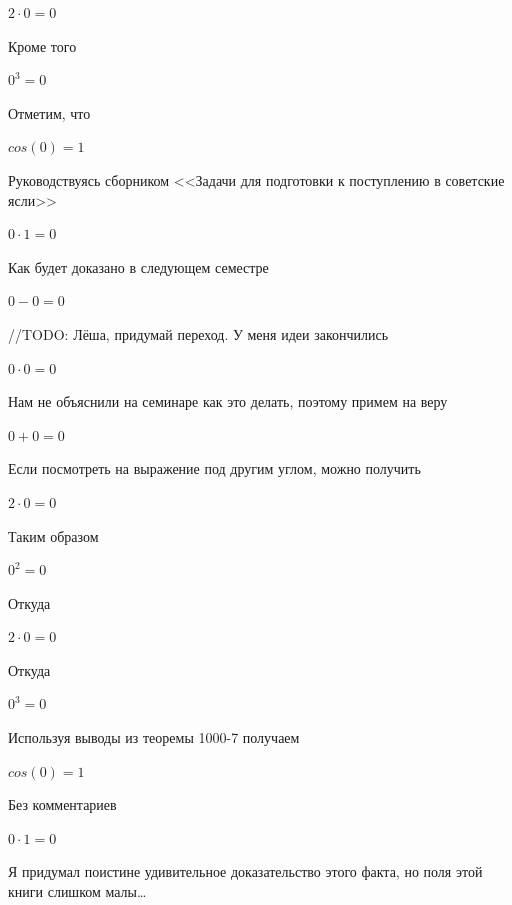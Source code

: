 \documentclass[12pt,a4paper,fleqn]{article}
\begin{document}
\begin{center}$2 \cdot 0 = 0$\end{center}
Кроме того

\begin{center}$0^{3} = 0$\end{center}
Отметим, что

\begin{center}$cos(0) = 1$\end{center}
Руководствуясь сборником <<Задачи для подготовки к поступлению в советские ясли>>\cite{link1}

\begin{center}$0 \cdot 1 = 0$\end{center}
Как будет доказано в следующем семестре

\begin{center}$0-0 = 0$\end{center}
//TODO: Лёша, придумай переход. У меня идеи закончились

\begin{center}$0 \cdot 0 = 0$\end{center}
Нам не объяснили на семинаре как это делать, поэтому примем на веру

\begin{center}$0+0 = 0$\end{center}
Если посмотреть на выражение под другим углом, можно получить

\begin{center}$2 \cdot 0 = 0$\end{center}
Таким образом

\begin{center}$0^{2} = 0$\end{center}
Откуда

\begin{center}$2 \cdot 0 = 0$\end{center}
Откуда

\begin{center}$0^{3} = 0$\end{center}
Используя выводы из теоремы 1000-7 получаем

\begin{center}$cos(0) = 1$\end{center}
Без комментариев\cite{link4}

\begin{center}$0 \cdot 1 = 0$\end{center}
Я придумал поистине удивительное доказательство этого факта, но поля этой книги слишком малы\ldots
\end{document}
